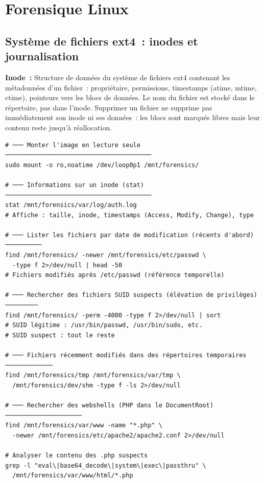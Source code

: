 \section{Forensique Linux}
\label{sec:forensics-linux}

\subsection{Système de fichiers ext4~: inodes et journalisation}

\begin{boxdef}
\textbf{Inode~:} Structure de données du système de fichiers ext4 contenant
les métadonnées d'un fichier~: propriétaire, permissions, timestamps (atime,
mtime, ctime), pointeurs vers les blocs de données. Le nom du fichier est
stocké dans le répertoire, pas dans l'inode. Supprimer un fichier ne
supprime pas immédiatement son inode ni ses données~: les blocs sont marqués
libres mais leur contenu reste jusqu'à réallocation.
\end{boxdef}

\begin{lstlisting}[style=StyleTerminal,
  caption={Analyse des artefacts Linux depuis une image montée},
  label={lst:linux-forensics}]
# ─── Monter l'image en lecture seule ────────────────────────────────────────
sudo mount -o ro,noatime /dev/loop0p1 /mnt/forensics/

# ─── Informations sur un inode (stat) ────────────────────────────────────────
stat /mnt/forensics/var/log/auth.log
# Affiche : taille, inode, timestamps (Access, Modify, Change), type

# ─── Lister les fichiers par date de modification (récents d'abord) ──────────
find /mnt/forensics/ -newer /mnt/forensics/etc/passwd \
  -type f 2>/dev/null | head -50
# Fichiers modifiés après /etc/passwd (référence temporelle)

# ─── Rechercher des fichiers SUID suspects (élévation de privilèges) ─────────
find /mnt/forensics/ -perm -4000 -type f 2>/dev/null | sort
# SUID légitime : /usr/bin/passwd, /usr/bin/sudo, etc.
# SUID suspect : tout le reste

# ─── Fichiers récemment modifiés dans des répertoires temporaires ─────────────
find /mnt/forensics/tmp /mnt/forensics/var/tmp \
  /mnt/forensics/dev/shm -type f -ls 2>/dev/null

# ─── Rechercher des webshells (PHP dans le DocumentRoot) ─────────────────────
find /mnt/forensics/var/www -name "*.php" \
  -newer /mnt/forensics/etc/apache2/apache2.conf 2>/dev/null

# Analyser le contenu des .php suspects
grep -l "eval\|base64_decode\|system\|exec\|passthru" \
  /mnt/forensics/var/www/html/*.php
\end{lstlisting}


